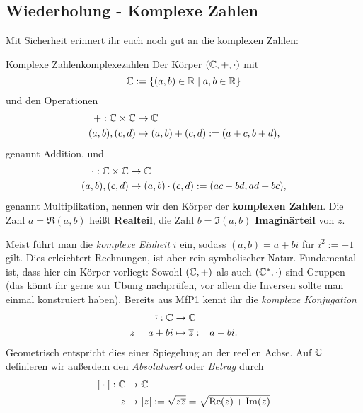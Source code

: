 \subsection{Wiederholung - Komplexe Zahlen}
Mit Sicherheit erinnert ihr euch noch gut an die komplexen Zahlen:
\begin{definition}{Komplexe Zahlen}{komplexezahlen}
Der Körper $(\mathbb{C}, +, \cdot)$ mit
\begin{equation}
\mathbb{C} := \{(a,b) \in \mathbb{R} \mid a,b \in \mathbb{R}\}
\end{equation}
und den Operationen
\begin{equation}
\begin{split}
+: \mathbb{C} \times \mathbb{C} &\to \mathbb{C}\\
(a,b), (c,d) &\mapsto (a,b) + (c,d) := (a+c,b+d),
\end{split}
\end{equation}
genannt Addition, und
\begin{equation}
\begin{split}
\cdot: \mathbb{C} \times \mathbb{C} &\to \mathbb{C}\\
(a,b),(c,d) &\mapsto (a,b) \cdot (c,d) := (ac-bd, ad+bc),
\end{split}
\end{equation}
genannt Multiplikation, nennen wir den Körper der \textbf{komplexen Zahlen}. Die Zahl $a=\Re(a,b)$ heißt \textbf{Realteil}, die Zahl $b=\Im(a,b)$ \textbf{Imaginärteil} von $z$. 
\end{definition}
Meist führt man die \textit{komplexe Einheit} $i$ ein, sodass $(a,b)=a+bi$ für $i^2:=-1$ gilt. Dies erleichtert Rechnungen, ist aber rein symbolischer Natur. Fundamental ist, dass hier ein Körper vorliegt: Sowohl $(\mathbb{C}, +)$ als auch $(\mathbb{C}^\ast, \cdot)$ sind Gruppen (das könnt ihr gerne zur Übung nachprüfen, vor allem die Inversen sollte man einmal konstruiert haben). Bereits aus MfP1 kennt ihr die \textit{komplexe Konjugation}
\begin{equation}
\begin{split}
\overline{\cdot}: \mathbb{C} &\to \mathbb{C}\\
z = a+bi &\mapsto \overline{z} := a-bi.
\end{split}
\end{equation}
Geometrisch entspricht dies einer Spiegelung an der reellen Achse. Auf $\mathbb{C}$ definieren wir außerdem den \textit{Absolutwert} oder \textit{Betrag} durch
\begin{equation}
\begin{split}
|\cdot |: \mathbb{C} &\to \mathbb{C}\\
z &\mapsto |z| := \sqrt{z \overline{z}} = \sqrt{\Re(z)+\Im(z)}
\end{split}
\end{equation}

